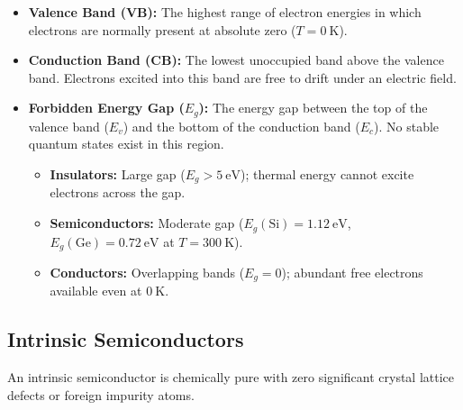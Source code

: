 \begin{itemize}
    \item \textbf{Valence Band (VB):} The highest range of electron energies in which electrons are normally present at absolute zero ($T = \SI{0}{\kelvin}$).
    \item \textbf{Conduction Band (CB):} The lowest unoccupied band above the valence band. Electrons excited into this band are free to drift under an electric field.
    \item \textbf{Forbidden Energy Gap ($E_g$):} The energy gap between the top of the valence band ($E_v$) and the bottom of the conduction band ($E_c$). No stable quantum states exist in this region.
    \begin{itemize}
        \item \textbf{Insulators:} Large gap ($E_g > \SI{5}{\electronvolt}$); thermal energy cannot excite electrons across the gap.
        \item \textbf{Semiconductors:} Moderate gap ($E_g(\text{Si}) = \SI{1.12}{\electronvolt}$, $E_g(\text{Ge}) = \SI{0.72}{\electronvolt}$ at $T = \SI{300}{\kelvin}$).
        \item \textbf{Conductors:} Overlapping bands ($E_g = 0$); abundant free electrons available even at $\SI{0}{\kelvin}$.
    \end{itemize}
\end{itemize}

\subsection{Intrinsic Semiconductors}
An intrinsic semiconductor is chemically pure with zero significant crystal lattice defects or foreign impurity atoms.

